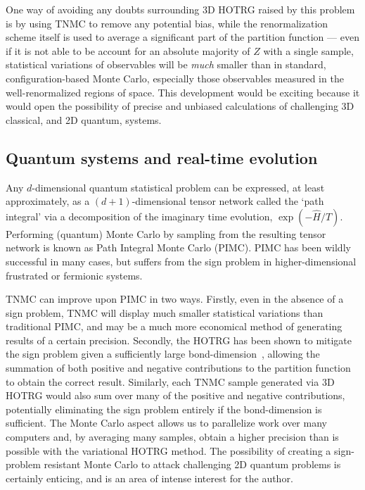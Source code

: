 \documentclass[aps,prl,nopacs,twocolumn]{revtex4}
\begin{document}
One way of avoiding any doubts surrounding 3D HOTRG raised by this problem is by using TNMC to remove any potential bias, while the renormalization scheme itself is used to average a significant part of the partition function --- even if it is not able to be account for an absolute majority of $Z$ with a single sample, statistical variations of observables will be \emph{much} smaller than in standard, configuration-based Monte Carlo, especially those observables measured in the well-renormalized regions of space. This development would be exciting because it would open the possibility of precise and unbiased calculations of challenging 3D classical, and 2D quantum, systems.

\subsection{Quantum systems and real-time evolution}

Any $d$-dimensional quantum statistical problem can be expressed, at least approximately, as a $(d+1)$-dimensional tensor network called the `path integral' via a decomposition of the imaginary time evolution, $\exp(-\hat{H}/T)$. Performing (quantum) Monte Carlo by sampling from the resulting tensor network is known as Path Integral Monte Carlo (PIMC). PIMC has been wildly successful in many cases, but suffers from the sign problem in higher-dimensional frustrated or fermionic systems.

TNMC can improve upon PIMC in two ways. Firstly, even in the absence of a sign problem, TNMC will display much smaller statistical variations than traditional PIMC, and may be a much more economical method of generating results of a certain precision. Secondly, the HOTRG has been shown to mitigate the sign problem given a sufficiently large bond-dimension~\cite{Denbleyker2014}, allowing the summation of both positive and negative contributions to the partition function to obtain the correct result. Similarly, each TNMC sample generated via 3D HOTRG would also sum over many of the positive and negative contributions, potentially eliminating the sign problem entirely if the bond-dimension is sufficient. The Monte Carlo aspect allows us to parallelize work over many computers and, by averaging many samples, obtain a higher precision than is possible with the variational HOTRG method. The possibility of creating a sign-problem resistant Monte Carlo to attack challenging 2D quantum problems is certainly enticing, and is an area of intense interest for the author.
\end{document}
